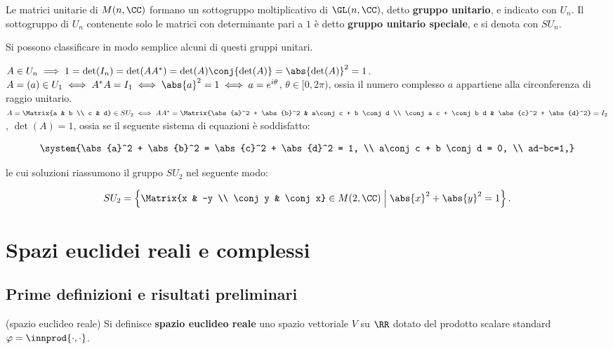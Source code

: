 \begin{definition}
	Le matrici unitarie di $M(n, \CC)$ formano un sottogruppo moltiplicativo di $\GL(n, \CC)$, detto \textbf{gruppo unitario},
	e indicato con $U_n$. Il sottogruppo di $U_n$ contenente solo le matrici con determinante pari a $1$ è
	detto \textbf{gruppo unitario speciale}, e si denota con $SU_n$.
\end{definition}

\begin{remark}\nl
	Si possono classificare in modo semplice alcuni di questi gruppi unitari.
	
	\li $A \in U_n \implies 1 = \det(I_n) = \det(A A^*) = \det(A) \conj{\det(A)} = \abs{\det(A)}^2 = 1$. \\
	\li $A = (a) \in U_1 \iff A^* A = I_1 \iff \abs{a}^2 = 1 \iff a = e^{i\theta}$, $\theta \in [0, 2\pi)$, ossia il numero complesso $a$ appartiene alla circonferenza di raggio unitario. \\
	\li $A = \Matrix{a & b \\ c & d} \in SU_2 \iff A A^* = \Matrix{\abs{a}^2 + \abs{b}^2 & a\conj c + b \conj d \\ \conj a c + \conj b d & \abs{c}^2 + \abs{d}^2} = I_2$, $\det(A) = 1$, ossia se il seguente
	sistema di equazioni è soddisfatto:
	
	\[ \system{\abs{a}^2 + \abs{b}^2 = \abs{c}^2 + \abs{d}^2 = 1, \\ a\conj c + b \conj d = 0, \\ ad-bc=1,} \]
	
	le cui soluzioni riassumono il gruppo $SU_2$ nel seguente modo:
	
	\[ SU_2 = \left\{ \Matrix{x & -y \\ \conj y & \conj x} \in M(2, \CC) \;\middle\vert\; \abs{x}^2 + \abs{y}^2 = 1 \right\}. \]
	
\end{remark}

\section{Spazi euclidei reali e complessi}

\subsection{Prime definizioni e risultati preliminari}

\begin{definition} (spazio euclideo reale)
	Si definisce \textbf{spazio euclideo reale} uno spazio vettoriale $V$ su $\RR$ dotato
	del prodotto scalare standard $\varphi = \innprod{\cdot, \cdot}$.
\end{definition}

